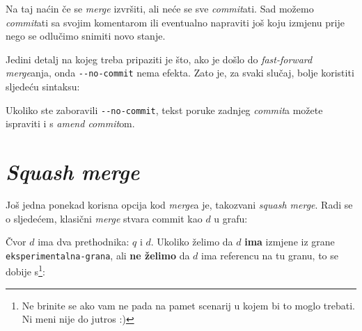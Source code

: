 Na taj naćin če se \emph{merge} izvršiti, ali neće se sve \emph{commit}ati. 
Sad možemo \emph{commit}ati sa svojim komentarom ili eventualno napraviti još koju izmjenu prije nego se odlučimo snimiti novo stanje.

Jedini detalj na kojeg treba pripaziti je što, ako je došlo do \emph{fast-forward} \emph{merge}anja, onda \verb+--no-commit+ nema efekta.
Zato je, za svaki slučaj, bolje koristiti sljedeću sintaksu:


Ukoliko ste zaboravili \verb+--no-commit+, tekst poruke zadnjeg \emph{commit}a možete ispraviti i s \emph{amend commit}om.

\section*{\emph{Squash merge}}

Još jedna ponekad korisna opcija kod \emph{merge}a je, takozvani \emph{squash merge}.
Radi se o sljedećem, klasični \emph{merge} stvara commit kao $d$ u grafu:



Čvor $d$ ima dva prethodnika: $q$ i $d$.
Ukoliko želimo da $d$ \textbf{ima} izmjene iz grane \verb+eksperimentalna-grana+, ali \textbf{ne želimo} da $d$ ima referencu na tu granu, to se dobije s\footnote{Ne brinite se ako vam ne pada na pamet scenarij u kojem bi to moglo trebati. Ni meni nije do jutros :)}:


